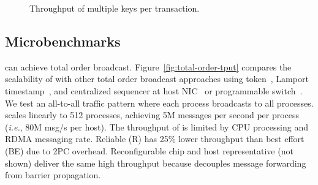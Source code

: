 \begin{figure}[t!]
\begin{minipage}{.31\textwidth}
		\centering
		\caption{Throughput of multiple keys per transaction.}
		\label{fig:multishard}
    \end{minipage}
	\hspace{0.01\textwidth}
\vspace{-15pt}
\end{figure}
\fi

\subsection{Microbenchmarks}
\label{sec:microbenchmark}

\sys{} can achieve total order broadcast.
Figure~\ref{fig:total-order-tput} compares the scalability of \sys{} with other total order broadcast approaches using token~\cite{rajagopalan1989token}, Lamport timestamp~\cite{lamport1978time}, and centralized sequencer at host NIC~\cite{kaminsky2016design} or programmable switch~\cite{eris}.
We test an all-to-all traffic pattern where each process broadcasts to all processes.
\sys{} scales linearly to 512 processes, achieving 5M messages per second per process (\textit{i.e.}, 80M msg/s per host).
The throughput of \sys is limited by CPU processing and RDMA messaging rate.
Reliable (R) \sys{} has 25\% lower throughput than best effort (BE) \sys{} due to 2PC overhead. %
Reconfigurable chip and host representative (not shown) deliver the same high throughput because \sys{} decouples message forwarding from barrier propagation.


